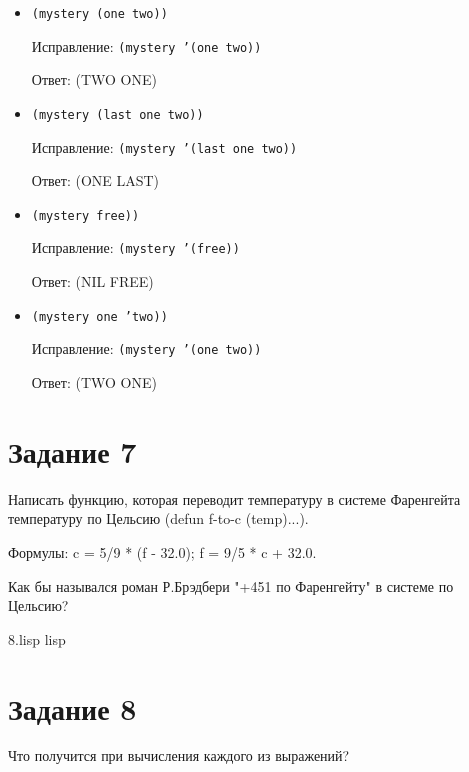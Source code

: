 \begin{itemize}
	\item \texttt{(mystery (one two))}
	
	Исправление: \texttt{(mystery '(one two))} 
	
	Ответ: (TWO ONE)
	
	\item \texttt{(mystery (last one two))}
	
	Исправление: \texttt{(mystery '(last one two))} 
	
	Ответ: (ONE LAST)
	
	\item \texttt{(mystery free))}
	
	Исправление: \texttt{(mystery '(free))} 
	
	Ответ: (NIL FREE)
	
	\item \texttt{(mystery one 'two))}
	
	Исправление: \texttt{(mystery '(one two))} 
	
	Ответ: (TWO ONE)
\end{itemize}

\section{Задание 7}
Написать функцию, которая переводит температуру в системе Фаренгейта температуру по Цельсию (defun f-to-c (temp)...).

Формулы: c = 5/9 * (f - 32.0); f = 9/5 * c + 32.0.

Как бы назывался роман Р.Брэдбери "+451 по Фаренгейту" в системе по Цельсию?

{8.lisp}
{lisp}
{}

\section{Задание 8}
Что получится при вычисления каждого из выражений?

